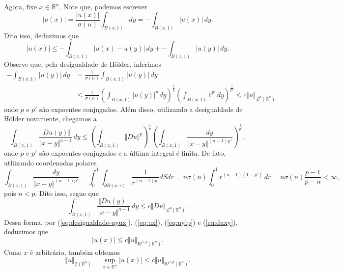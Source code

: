 \documentclass[a4paper, 11pt]{book}
\theoremstyle{definition}
\newcommand{\bR}{\mathbb{R}}
\newcommand{\cC}{\mathcal{C}}
\newcommand{\cL}{\mathcal{L}}
\newcommand{\cW}{\mathcal{W}}
\newcommand{\sint}{-\!\!\!\!\!\!\int}
\begin{document}
\begin{prf}
    Agora, fixe $x \in \bR^n$. Note que, podemos escrever
    \[
        |u(x)| = \frac{|u(x)|}{\sigma(n)}\int_{B(x,1)} dy = \sint_{B(x,1)} |u(x)| \,dy.
    \]
    Dito isso, deduzimos que
    \begin{equation} \label{eq:ux}
        |u(x)| \leqslant \sint_{B(x,1)} |u(x) - u(y)| \,dy + \sint_{B(x,1)} |u(y)|\,dy.
    \end{equation}
    Observe que, pela desigualdade de Hölder, inferimos
    \begin{equation} \label{eq:uylp}
        \begin{aligned}
            \sint_{B(x,1)} |u(y)| \,dy &= \frac{1}{\sigma(n)} \int_{B(x,1)} |u(y)| \,dy\\ 
            &\leqslant \frac{1}{\sigma(n)} \left( \int_{B(x,1)} |u(y)|^p\,dy \right)^{\frac{1}{p}} \left( \int_{B(x,1)} 1^{p'} \,dy \right)^{\frac{1}{p'}} \leqslant c \Vert u \Vert_{\cL^p(\bR^n)}
        \end{aligned}
    \end{equation}
    onde $p$ e $p'$ são expoentes conjugados.
    Além disso, utilizando a desigualdade de Hölder novamente, chegamos a
    \[
        \int_{B(x,1)} \frac{\Vert Du(y) \Vert}{\Vert x - y \Vert^{n-1}} \,dy \leqslant \left( \int_{B(x,1)} \Vert Du \Vert^p \right)^{\frac{1}{p}} \left( \int_{B(x,1)} \frac{dy}{\Vert x - y \Vert^{(n-1)p'}} \right)^{\frac{1}{p'}},
    \]
    onde $p$ e $p'$ são expoentes conjugados e a última integral é finita.
    De fato, utliizando coordenadas polares
    \[
        \int_{B(x,1)} \frac{dy}{\Vert x - y \Vert^{(n-1)p'}} = \int_0^1 \int_{\partial B(x,r)} \frac{1}{r^{(n-1)p'}} dSdr = n\sigma(n)\int_0^1 r^{(n-1)(1-p')} \,dr = n \sigma(n)  \frac{p-1}{p-n} < \infty,
    \]
    pois $n < p$.
    Dito isso, segue que
    \begin{equation} \label{eq:duxy}
        \int_{B(x,1)} \frac{\Vert Du(y) \Vert}{\Vert x - y \Vert^{n-1}} \,dy \leqslant c\Vert Du \Vert_{\cL^p(\bR^n)}.
    \end{equation}
    Dessa forma, por (\ref{eq:desigualdade-uyux}), (\ref{eq:ux}), (\ref{eq:uylp}) e (\ref{eq:duxy}), deduzimos que
    \[
        |u(x)| \leqslant c \Vert u \Vert_{\cW^{1,p}(\bR^n)}.
    \]
    Como $x$ é arbitrário, também obtemos
    \begin{equation} \label{eq:normac}
        \Vert u \Vert_{\cC(\bR^n)} = \sup_{x \in \bR^n} |u(x)| \leqslant c \Vert u \Vert_{\cW^{1,p}(\bR^n)}.
    \end{equation}


\end{prf}
\end{document}
